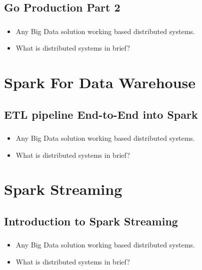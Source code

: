 \subsection{Go Production Part 2}

\begin{frame}
  \frametitle{\subsecname}
	\begin{itemize}[<+->]
		\item Any Big Data solution working based distributed systems.
		\item What is distributed systems in brief?
	\end{itemize}
\end{frame}


\section{Spark For Data Warehouse}
\subsection{ETL pipeline End-to-End into Spark}

\begin{frame}
  \frametitle{\subsecname}
	\begin{itemize}[<+->]
		\item Any Big Data solution working based distributed systems.
		\item What is distributed systems in brief?
	\end{itemize}
\end{frame}


\section{Spark Streaming}

\subsection{Introduction to Spark Streaming}

\begin{frame}
  \frametitle{\subsecname}
	\begin{itemize}[<+->]
		\item Any Big Data solution working based distributed systems.
		\item What is distributed systems in brief?
	\end{itemize}
\end{frame}

